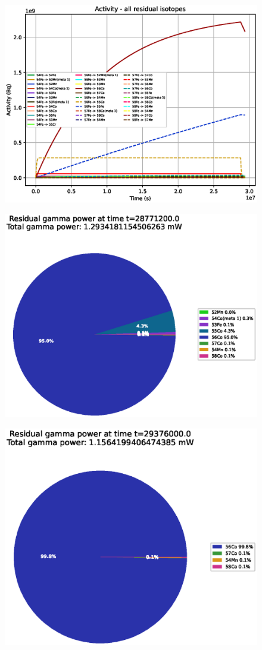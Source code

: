\begin{figure}[!htb]
\centering
\includegraphics[width=0.7\linewidth]{chapters/results_activity_code/fe_100dpa/by_isotope/20MeV_all_radioactive_isotopes.eps}
\caption{}
\label{fig:5mev-proton-100dpa-activity}
\end{figure}

\begin{figure}[!htb]
\centering
\includegraphics[width=0.7\linewidth]{chapters/results_activity_code/fe_100dpa/endofbeam/20MeV_0400_28771200.eps}
\caption{}
\label{fig:5mev-proton-100dpa}
\end{figure}

\begin{figure}[!htb]
\centering
\includegraphics[width=0.7\linewidth]{chapters/results_activity_code/fe_100dpa/endofbeam/20MeV_0500_29376000.eps}
\caption{}
\label{fig:5mev-proton-100dpa}
\end{figure}



